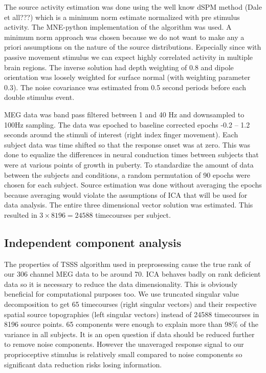 \documentclass[]{article}
\begin{document}
The source activity estimation was done using the well know dSPM method (Dale et all???) which is a minimum norm estimate normalized with pre stimulus activity. The MNE-python implementation of the algorithm was used. A minimum norm approach was chosen because we do not want to make any a priori assumptions on the nature of the source distributions. Especially since with passive movement stimulus we can expect highly correlated activity in multiple brain regions. The inverse solution had depth weighting of 0.8 and dipole orientation was loosely weighted for surface normal (with weighting parameter 0.3). The noise covariance was estimated from 0.5 second periods before each double stimulus event. 


MEG data was band pass filtered between 1 and 40 Hz and downsampled to 100Hz sampling. The data was epoched to baseline corrected epochs -0.2 -- 1.2 seconds around the stimuli of interest (right index finger movement). Each subject data was time shifted so that the response onset was at zero. This was done to equalize the differences in neural conduction times between subjects that were at various points of growth in puberty. To standardize the amount of data between the subjects and conditions, a random permutation of 90 epochs were chosen for each subject. Source estimation was done without averaging the epochs because averaging would violate the assumptions of ICA that will be used for data analysis. The entire three dimensional vector solution was estimated. This resulted in $3\times8196 = 24588$ timecourses per subject. 

\subsection*{Independent component analysis}

The properties of TSSS algorithm used in preprosessing cause the true rank of our 306 channel MEG data to be around 70. ICA behaves badly on rank deficient data so it is necessary to reduce the data dimensionality. This is obviously beneficial for computational purposes too. We use truncated singular value decomposition to get 65 timecourses (right singular vectors) and their respective spatial source topographies (left singular vectors) instead of 24588 timecourses in 8196 source points. 65 components were enough to explain more than 98\% of the variance in all subjects. It is an open question if data should be reduced further to remove noise components. However the unaveraged response signal to our proprioceptive stimulus is relatively small compared to noise components so significant data reduction risks losing information. %
\end{document}
